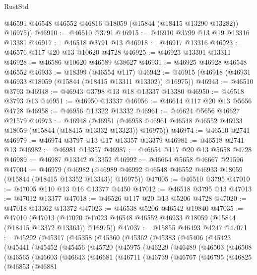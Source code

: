 \begin{lexlean}{RustStd}
\begin{coremodule}
        @46591
        @46548
        @46552
        @46816
        @18059
        (@15844 (@18415 @13290 @13282))
        @16975))
@46910 := @46510 @3791
@46915 := @46910 @3799 @13 @19 @13316 @13381
@46917 := @46518 @3791 @13
@46918 := @46917 @13316
@46923 := @46576 @117 @20 @13 @10620 @4728
@46925 := @46923 @13301 @13311
@46928 := @46586 @10620 @46589 @38627
@46931 := @46925 @46928 @46548 @46552
@46933 := @18399 (@46554 @117)
@46942 := @46915 (@46918 (@46931 @46933 @18059 (@15844 (@18415 @13311 @13302)) @16975))
@46943 := @46510 @3793
@46948 := @46943 @3798 @13 @18 @13337 @13380
@46950 := @46518 @3793 @13
@46951 := @46950 @13337
@46956 := @46614 @117 @20 @13 @5656 @4728
@46958 := @46956 @13322 @13332
@46961 := @46624 @5656 @46627 @21579
@46973 := @46948
    (@46951 (@46958 @46961 @46548 @46552 @46933 @18059 (@15844 (@18415 @13332 @13323)) @16975))
@46974 := @46510 @2741
@46979 := @46974 @3797 @13 @17 @13357 @13379
@46981 := @46518 @2741 @13
@46982 := @46981 @13357
@46987 := @46654 @117 @20 @13 @5658 @4728
@46989 := @46987 @13342 @13352
@46992 := @46664 @5658 @46667 @21596
@47004 := @46979
    (@46982 (@46989 @46992 @46548 @46552 @46933 @18059 (@15844 (@18415 @13352 @13343)) @16975))
@47005 := @46510 @3795
@47010 := @47005 @110 @13 @16 @13377 @4450
@47012 := @46518 @3795 @13
@47013 := @47012 @13377
@47018 := @46526 @117 @20 @13 @5206 @4728
@47020 := @47018 @13362 @13372
@47023 := @46538 @5206 @46542 @19840
@47035 := @47010
    (@47013 (@47020 @47023 @46548 @46552 @46933 @18059 (@15844 (@18415 @13372 @13363)) @16975))
@47037 := @15855 @46493 @4247
@47071 := @45292
    (@45317
      (@45358
        (@45360
          (@45362
            (@45383
              (@45406
                (@45423
                  (@45441
                    (@45452
                      (@45456
                        (@45720
                          (@45975
                            (@46229
                              (@46489
                                (@46503
                                  (@46508
                                    (@46565
                                      (@46603
                                        (@46643
                                          (@46681
                                            (@46711
                                              (@46739
                                                (@46767
                                                  (@46795
                                                    (@46825
                                                      (@46853
                                                        (@46881

\end{coremodule}
\end{lexlean}
